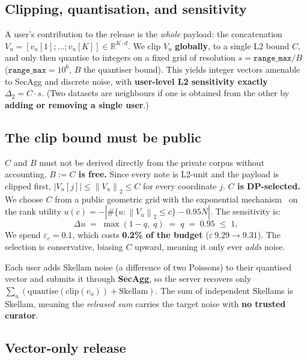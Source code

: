\documentclass[conference]{IEEEtran}
\theoremstyle{remark}
\newcommand{\eps}{\varepsilon}
\newcommand{\R}{\mathbb{R}}
\newcommand{\norm}[1]{\left\lVert #1 \right\rVert}
\begin{document}
\subsection{Clipping, quantisation, and sensitivity}\label{sec:clipping}

A user's contribution to the release is the \emph{whole} payload: the concatenation $V_u = [v_u[1]; \dots; v_u[K]] \in \R^{K \cdot d}$. We clip $V_u$ \textbf{globally}, to a single L2 bound $C$, and only then quantise to integers on a fixed grid of resolution $s = \texttt{range\_max} / B$ ($\texttt{range\_max} = 10^{6}$, $B$ the quantiser bound). This yields integer vectors amenable to SecAgg and discrete noise, with \textbf{user-level L2 sensitivity exactly $\Delta_2 = C \cdot s$}. (Two datasets are neighbours if one is obtained from the other by \textbf{adding or removing a single user}.)

\subsection{The clip bound must be public}\label{sec:clip}

$C$ and $B$ must not be derived directly from the private corpus without accounting.
\textbf{$B := C$ is free.} Since every note is L2-unit and the payload is clipped first, $|V_u[j]| \leq \norm{V_u}_2 \leq C$ for every coordinate $j$.
\textbf{$C$ is DP-selected.} We choose $C$ from a public geometric grid with the exponential mechanism~\cite{mcsherry2007expmech} on the rank utility $u(c) = -\left| \#\{u : \norm{V_u}_2 \leq c\} - 0.95 N \right|$. The sensitivity is:
\begin{equation}\label{eq:clip-sens}
      \Delta u \;=\; \max(1 - q,\; q) \;=\; q \;=\; 0.95 \;\leq\; 1,
    \end{equation}
We spend $\eps_c = 0.1$, which costs \textbf{0.2\% of the budget} ($\eps\ 9.29 \to 9.31$). The selection is conservative, biasing $C$ upward, meaning it only ever \emph{adds} noise.

Each user adds Skellam noise (a difference of two Poissons) to their quantised vector and submits it through \textbf{SecAgg}, so the server recovers only $\sum_u (\mathrm{quantise}(\mathrm{clip}(v_u)) + \mathrm{Skellam})$. The sum of independent Skellams is Skellam, meaning the \emph{released sum} carries the target noise with \textbf{no trusted curator}. 

\subsection{Vector-only release}\label{sec:vector-only}
\end{document}
